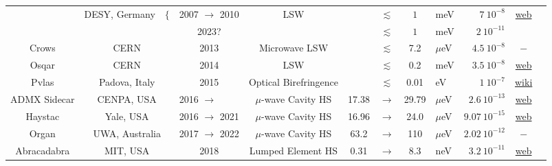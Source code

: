 \begin{table}[!p]
\begin{center}
{\begin{tabular}{ccccccclrcc}
        \rule{0pt}{1ex}
        \multirow{2}{*}{\sc ALPS} & \multirow{2}{*}{DESY, Germany~~$\Big\{$} & 2007 $\to$ 2010 & \multirow{2}{*}{LSW} & &$\lesssim$ & $1$ & meV & $7\ 10^{-8}$ &\multirow{2}{*}{\href{https://alps.desy.de/}{web}} & \multirow{2}{*}{\cite{ALPS}}
        \\
        & & 2023? & & &$\lesssim$ & $1$ & meV & $2\ 10^{-11}$ & & 
        \\

        \rule{0pt}{1ex}
        {\sc Crows} & CERN & 2013 & Microwave LSW & &$\lesssim$ & 7.2 &$\mu$eV & $4.5\ 10^{-8}$ & $-$ &\cite{CROWS} 
        \\

        \rule{0pt}{1ex}
        {\sc Osqar} & CERN & 2014 & LSW & &$\lesssim$ & 0.2 &meV & $3.5\ 10^{-8}$ &\href{https://home.cern/science/experiments/osqar}{web} & \cite{OSQAR}
        \\

        \rule{0pt}{1ex}
        {\sc Pvlas} & Padova, Italy & 2015 & Optical Birefringence & &$\lesssim$ & 0.01 &eV & $1\ 10^{-7}$ &\href{https://en.wikipedia.org/wiki/PVLAS}{wiki} & \cite{PVLAS}
        \\

        \rule{0pt}{1ex} 
        {\sc ADMX Sidecar} & CENPA, USA & 2016 $\to$ ~~~~ & $\mu$-wave Cavity HS & 17.38 &$\to$ &29.79 &$\mu$eV & $2.6\ 10^{-13} $ & \href{https://depts.washington.edu/admx/}{web} & \cite{ADMX} 
        \\

        \rule{0pt}{1ex}
        {\sc Haystac} & Yale, USA & 2016 $\to$ 2021 & $\mu$-wave Cavity HS & 16.96 &$\to$ & 24.0 &$\mu$eV & $9.07\ 10^{-15}$ &\href{https://haystac.yale.edu/}{web} &\cite{HAYSTAC}
        \\

        \rule{0pt}{1ex}
        {\sc Organ} & UWA, Australia & 2017 $\to$ 2022& $\mu$-wave Cavity HS &63.2 &$\to$ &110 &$\mu$eV & $2.02\ 10^{-12}$ & $-$ &\cite{ORGAN}
        \\

        \rule{0pt}{1ex}
        {\sc Abracadabra}  & MIT, USA & 2018  & Lumped Element HS & 0.31 &$\to$ &8.3 &neV  & $3.2 \  10^{-11} $  & \href{https://abracadabra.mit.edu/abracadabra}{web} & \cite{ABRACADABRA}
        \\


\end{tabular}}
\end{center}
\end{table}
